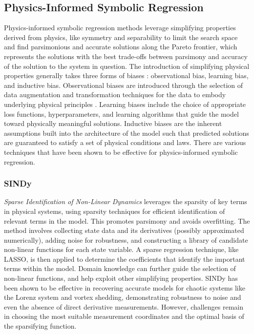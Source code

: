 \documentclass[fleqn,10pt]{olplainarticle}
\numberwithin{equation}{subsection}
\begin{document}
\subsection{Physics-Informed Symbolic Regression}
Physics-informed symbolic regression methods leverage simplifying properties derived from physics, like symmetry and separability to limit the search space and find parsimonious and accurate solutions along the Pareto frontier, which represents the solutions with the best trade-offs between parsimony and accuracy of the solution to the system in question. The introduction of simplifying physical properties generally takes three forms of biases \cite{Khoo2023.1}: observational bias, learning bias, and inductive bias. Observational biases are introduced through the selection of data augmentation and transformation techniques for the data to embody underlying physical principles \cite{Karniadakis}. Learning biases include the choice of appropriate loss functions, hyperparameters, and learning algorithms that guide the model toward physically meaningful solutions. Inductive biases are the inherent assumptions built into the architecture of the model such that predicted solutions are guaranteed to satisfy a set of physical conditions and laws. There are various techniques that have been shown to be effective for physics-informed symbolic regression.

\subsubsection{SINDy}\label{sec:sindy}
\emph{Sparse Identification of Non-Linear Dynamics} \cite{Brunton2016} leverages the sparsity of key terms in physical systems, using sparsity techniques for efficient identification of relevant terms in the model. This promotes parsimony and avoids overfitting. The method involves collecting state data and its derivatives (possibly approximated numerically), adding noise for robustness, and constructing a library of candidate non-linear functions for each state variable. A sparse regression technique, like LASSO, is then applied to determine the coefficients that identify the important terms within the model. Domain knowledge can further guide the selection of non-linear functions, and help exploit other simplifying properties. SINDy has been shown to be effective in recovering accurate models for chaotic systems like the Lorenz system and vortex shedding, demonstrating robustness to noise and even the absence of direct derivative measurements. However, challenges remain in choosing the most suitable measurement coordinates and the optimal basis of the sparsifying function.
\end{document}

